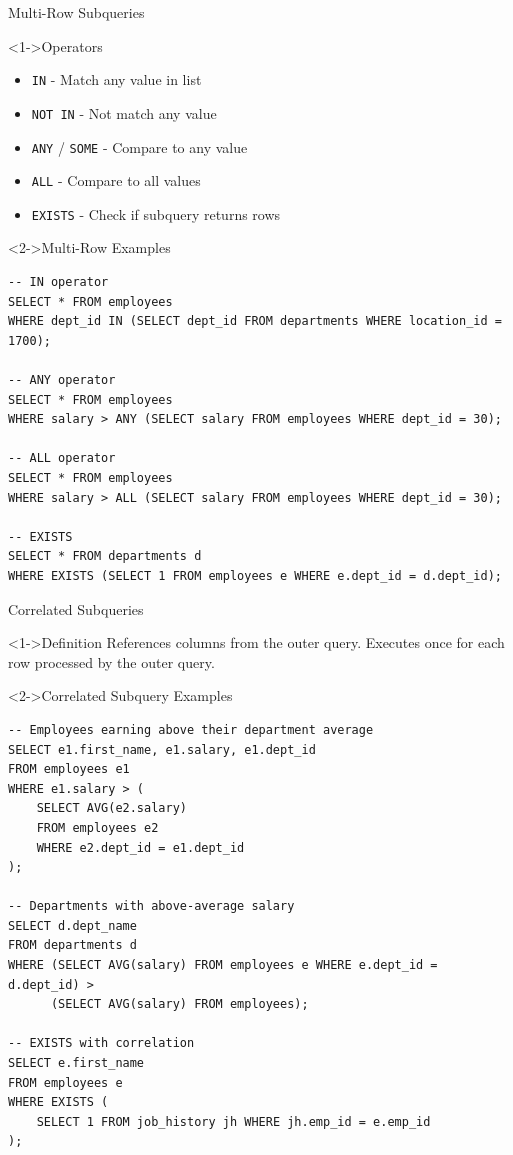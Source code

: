 \documentclass[aspectratio=169,11pt]{beamer}
\begin{document}
\begin{frame}[fragile]{Multi-Row Subqueries}
\begin{block}<1->{Operators}
\begin{itemize}
    \item \texttt{IN} - Match any value in list
    \item \texttt{NOT IN} - Not match any value
    \item \texttt{ANY} / \texttt{SOME} - Compare to any value
    \item \texttt{ALL} - Compare to all values
    \item \texttt{EXISTS} - Check if subquery returns rows
\end{itemize}
\end{block}

\pause
\begin{exampleblock}<2->{Multi-Row Examples}
\begin{lstlisting}
-- IN operator
SELECT * FROM employees
WHERE dept_id IN (SELECT dept_id FROM departments WHERE location_id = 1700);

-- ANY operator
SELECT * FROM employees
WHERE salary > ANY (SELECT salary FROM employees WHERE dept_id = 30);

-- ALL operator
SELECT * FROM employees
WHERE salary > ALL (SELECT salary FROM employees WHERE dept_id = 30);

-- EXISTS
SELECT * FROM departments d
WHERE EXISTS (SELECT 1 FROM employees e WHERE e.dept_id = d.dept_id);
\end{lstlisting}
\end{exampleblock}
\end{frame}

\begin{frame}[fragile]{Correlated Subqueries}
\begin{block}<1->{Definition}
References columns from the outer query. Executes once for each row processed by the outer query.
\end{block}

\pause
\begin{exampleblock}<2->{Correlated Subquery Examples}
\begin{lstlisting}
-- Employees earning above their department average
SELECT e1.first_name, e1.salary, e1.dept_id
FROM employees e1
WHERE e1.salary > (
    SELECT AVG(e2.salary)
    FROM employees e2
    WHERE e2.dept_id = e1.dept_id
);

-- Departments with above-average salary
SELECT d.dept_name
FROM departments d
WHERE (SELECT AVG(salary) FROM employees e WHERE e.dept_id = d.dept_id) > 
      (SELECT AVG(salary) FROM employees);

-- EXISTS with correlation
SELECT e.first_name
FROM employees e
WHERE EXISTS (
    SELECT 1 FROM job_history jh WHERE jh.emp_id = e.emp_id
);
\end{lstlisting}
\end{exampleblock}
\end{frame}
\end{document}
